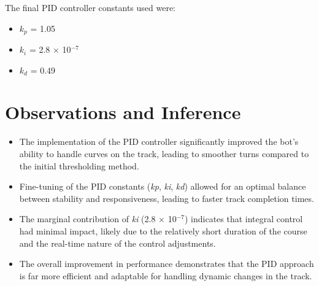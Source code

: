 \documentclass{article}
\begin{document}
The final PID controller constants used were:
\begin{itemize}[noitemsep]
    \item $k_p$ = 1.05
    \item $k_i$ = 2.8 $\times$ 10$^{-7}$
    \item $k_d$ = 0.49
\end{itemize}

\section{Observations and Inference}

\begin{itemize}[noitemsep]
    \item The implementation of the PID controller significantly improved the bot's ability to handle curves on the track, leading to smoother turns compared to the initial thresholding method.
    \item Fine-tuning of the PID constants (\textit{kp}, \textit{ki}, \textit{kd}) allowed for an optimal balance between stability and responsiveness, leading to faster track completion times.
    \item The marginal contribution of \textit{ki} (2.8 × 10$^{-7}$) indicates that integral control had minimal impact, likely due to the relatively short duration of the course and the real-time nature of the control adjustments.
    \item The overall improvement in performance demonstrates that the PID approach is far more efficient and adaptable for handling dynamic changes in the track.
\end{itemize}
\end{document}
